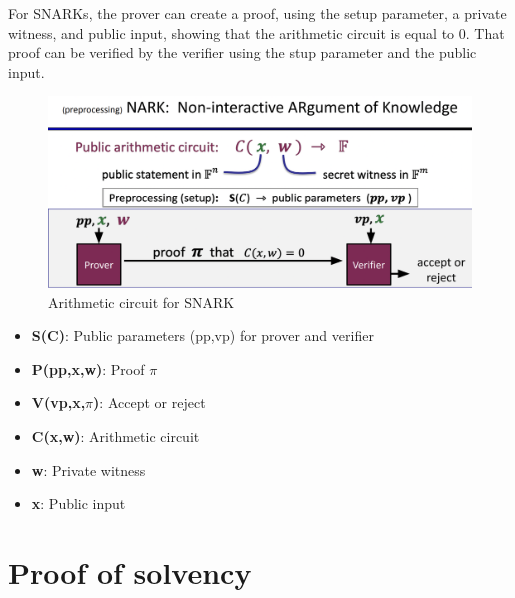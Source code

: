 For SNARKs, the prover can create a proof, using the setup parameter, a private witness, and public input,
showing that the arithmetic circuit is equal to 0. That proof can be verified by the verifier using the stup parameter
and the public input.

\begin{figure}[H]
    \centering
    \includegraphics[width=130mm]{Circuit.png}
    \caption{Arithmetic circuit for SNARK \cite{ZKP23}}
    \label{overflow}
    \end{figure}

\begin{itemize}

    \item \textbf{S(C)}: Public parameters (pp,vp) for prover and verifier
    
    \item \textbf{P(pp,x,w)}: Proof $\pi$

    \item \textbf{V(vp,x,$\pi$)}: Accept or reject

    \item \textbf{C(x,w)}: Arithmetic circuit

    \item \textbf{w}: Private witness

    \item \textbf{x}: Public input
    
    \end{itemize}




\section{Proof of solvency}

 




